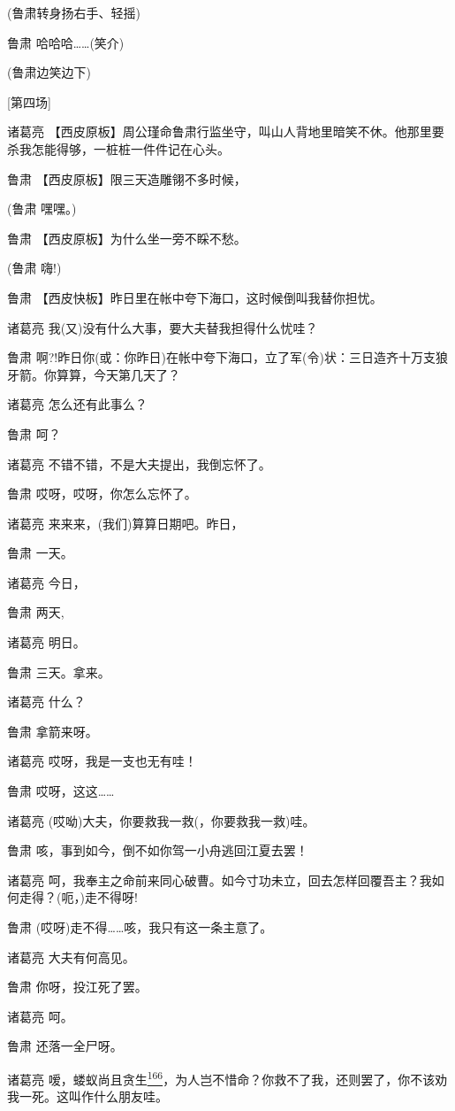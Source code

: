 (鲁肃转身扬右手、轻摇)

鲁肃 哈哈哈\ldots{}\ldots{}(笑介)

(鲁肃边笑边下)

{[}第四场{]}

诸葛亮
【西皮原板】周公瑾命鲁肃行监坐守，叫山人背地里暗笑不休。他那里要杀我怎能得够，一桩桩一件件记在心头。

鲁肃 【西皮原板】限三天造雕翎不多时候，

(鲁肃 嘿嘿。)

鲁肃 【西皮原板】为什么坐一旁不睬不愁。

(鲁肃 嗨!)

鲁肃 【西皮快板】昨日里在帐中夸下海口，这时候倒叫我替你担忧。

诸葛亮 我(又)没有什么大事，要大夫替我担得什么忧哇？

鲁肃
啊?!昨日你(或：你昨日)在帐中夸下海口，立了军(令)状：三日造齐十万支狼牙箭。你算算，今天第几天了？

诸葛亮 怎么还有此事么？

鲁肃 呵？

诸葛亮 不错不错，不是大夫提出，我倒忘怀了。

鲁肃 哎呀，哎呀，你怎么忘怀了。

诸葛亮 来来来，(我们)算算日期吧。昨日，

鲁肃 一天。

诸葛亮 今日，

鲁肃 两天,

诸葛亮 明日。

鲁肃 三天。拿来。

诸葛亮 什么？

鲁肃 拿箭来呀。

诸葛亮 哎呀，我是一支也无有哇！

鲁肃 哎呀，这这\ldots{}\ldots{}

诸葛亮 (哎呦)大夫，你要救我一救(，你要救我一救)哇。

鲁肃 咳，事到如今，倒不如你驾一小舟逃回江夏去罢！

诸葛亮
呵，我奉主之命前来同心破曹。如今寸功未立，回去怎样回覆吾主？我如何走得？(呃，)走不得呀!

鲁肃 (哎呀)走不得\ldots{}\ldots{}咳，我只有这一条主意了。

诸葛亮 大夫有何高见。

鲁肃 你呀，投江死了罢。

诸葛亮 呵。

鲁肃 还落一全尸呀。

诸葛亮
嗳，蝼蚁尚且贪生\protect\hyperlink{fn166}{\textsuperscript{166}}，为人岂不惜命？你救不了我，还则罢了，你不该劝我一死。这叫作什么朋友哇。

